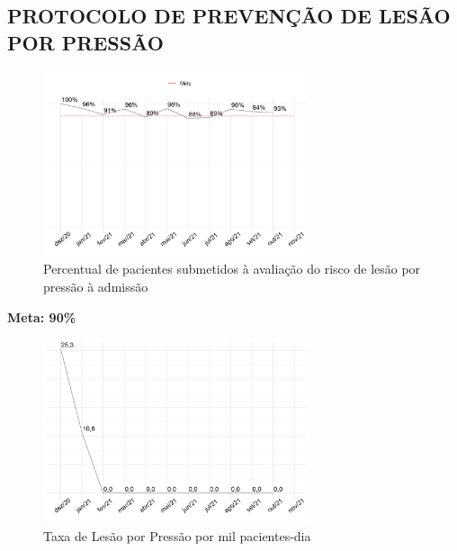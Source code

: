 \documentclass[
  a4paper]{article}
\begin{document}
\begin{table}[H]

\caption{\label{tab:unnamed-chunk-15}Distribuição do número de quedas}
\centering
{}
\end{table}

\newpage 
\subsection{PROTOCOLO DE PREVENÇÃO DE LESÃO POR PRESSÃO}

\begin{figure}[H]
\caption{Percentual de pacientes submetidos à avaliação do risco de lesão por pressão à admissão}
\includegraphics[width=0.7\textwidth]{Imagens/lesao_pressao.png}
\end{figure}

\begin{center}
 \textbf{Meta: 90\%}
\end{center}

\begin{figure}[H]
\caption{Taxa de Lesão por Pressão por mil pacientes-dia}
\includegraphics[width=0.7\textwidth]{Imagens/lesaoPressao_pacientes_dia.png}
\end{figure}
\end{document}
